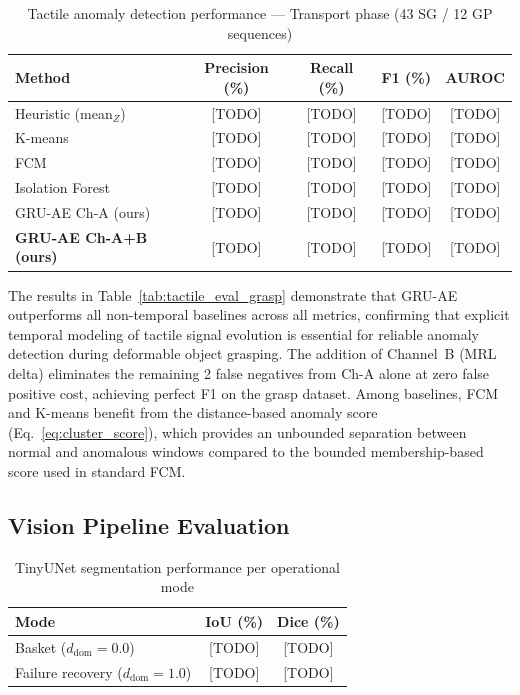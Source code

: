 \documentclass[pdflatex,sn-mathphys-num]{sn-jnl}%
\theoremstyle{thmstyleone}%
\theoremstyle{thmstyletwo}%
\theoremstyle{thmstylethree}%
\begin{document}
\begin{table}[h]
\caption{Tactile anomaly detection performance — Transport phase (43 SG / 12 GP sequences)}
\label{tab:tactile_eval_transport}
\centering
\begin{tabular}{lcccc}
\hline
Method & Precision (\%) & Recall (\%) & F1 (\%) & AUROC \\
\hline
Heuristic (mean$_Z$)    & [TODO] & [TODO] & [TODO] & [TODO] \\
K-means                 & [TODO] & [TODO] & [TODO] & [TODO] \\
FCM                     & [TODO] & [TODO] & [TODO] & [TODO] \\
Isolation Forest        & [TODO] & [TODO] & [TODO] & [TODO] \\
GRU-AE Ch-A (ours)      & [TODO] & [TODO] & [TODO] & [TODO] \\
\textbf{GRU-AE Ch-A+B (ours)} & [TODO] & [TODO] & [TODO] & [TODO] \\
\hline
\end{tabular}
\end{table}

The results in Table~\ref{tab:tactile_eval_grasp} demonstrate that GRU-AE outperforms all non-temporal baselines across all metrics, confirming that explicit temporal modeling of tactile signal evolution is essential for reliable anomaly detection during deformable object grasping. The addition of Channel~B (MRL delta) eliminates the remaining 2 false negatives from Ch-A alone at zero false positive cost, achieving perfect F1 on the grasp dataset. Among baselines, FCM and K-means benefit from the distance-based anomaly score (Eq.~\eqref{eq:cluster_score}), which provides an unbounded separation between normal and anomalous windows compared to the bounded membership-based score used in standard FCM.

\subsection{Vision Pipeline Evaluation}
\begin{table}[h]
\caption{TinyUNet segmentation performance per operational mode}
\label{tab:vision_eval}
\centering
\begin{tabular}{lcc}
\hline
Mode & IoU (\%) & Dice (\%) \\
\hline
Basket ($d_\text{dom} = 0.0$)          & [TODO] & [TODO] \\
Failure recovery ($d_\text{dom} = 1.0$) & [TODO] & [TODO] \\
\hline
\end{tabular}
\end{table}
\end{document}
